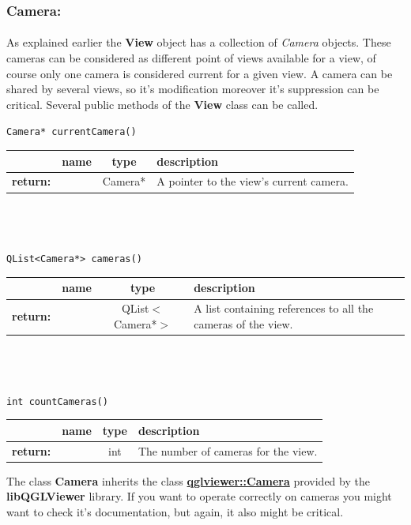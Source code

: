 \documentclass[a4paper]{scrreprt}
\begin{document}
	\subsubsection{Camera:}
	\paragraph{}
	As explained earlier the \textbf{View} object has a collection of
	\textit{Camera} objects. These cameras can be considered as different point of
	views available for a view, of course only one camera is considered current
	for a given view. A camera can be shared by several views, so it's modification
	moreover it's suppression can be critical. Several public methods of the
	\textbf{View} class can be called.
	\begin{center}
		\texttt{Camera* currentCamera()}\\
	\begin{tabular}{|l|c|c|p{}|}
		\hline
		~ & name & type & description
		\\ \hline
		\textbf{return:} & ~ & Camera* &
			A pointer to the view's current camera.
		\\ \hline
	\end{tabular}
	\\~\\~\\
		\texttt{QList<Camera*> cameras()}\\
	\begin{tabular}{|l|c|c|p{}|}
		\hline
		~ & name & type & description
		\\ \hline
		\textbf{return:} & ~ & QList$<$Camera*$>$ &
			A list containing references to all the cameras of the view.
		\\ \hline
	\end{tabular}
	\\~\\~\\
		\texttt{int countCameras()}\\
	\begin{tabular}{|l|c|c|p{}|}
		\hline
		~ & name & type & description
		\\ \hline
		\textbf{return:} & ~ & int &
			The number of cameras for the view.
		\\ \hline
	\end{tabular}
	\end{center}
	The class \textbf{Camera} inherits the class
	\href{http://www.libqglviewer.com/refManual/classqglviewer_1_1Camera.html}
	{\textbf{qglviewer::Camera}} provided by the \textbf{libQGLViewer} library. If
	you want to operate correctly on cameras you might want to check it's
	documentation, but again, it also might be critical.
	
\end{document}

